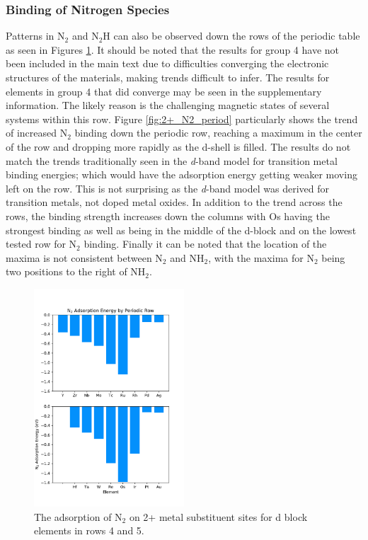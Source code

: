 \subsubsection{Binding of Nitrogen Species}

Patterns in N$_2$ and N$_2$H can also be observed down the rows of the periodic table as seen in Figures \ref{fig:N2_rows}. It should be noted that the results for group 4 have not been included in the main text due to difficulties converging the electronic structures of the materials, making trends difficult to infer. The results for elements in group 4 that did converge may be seen in the supplementary information. The likely reason is the challenging magnetic states of several systems within this row. Figure \ref{fig:2+_N2_period} particularly shows the trend of increased N$_2$ binding down the periodic row, reaching a maximum in the center of the row and dropping more rapidly as the d-shell is filled. The results do not match the trends traditionally seen in the \textit{d}-band model\cite{Nilsson_2008} for transition metal binding energies; which would have the adsorption energy getting weaker moving left on the row. This is not surprising as the \textit{d}-band model was derived for transition metals, not doped metal oxides. In addition to the trend across the rows, the binding strength increases down the columns with Os having the strongest binding as well as being in the middle of the d-block and on the lowest tested row for N$_2$ binding. Finally it can be noted that the location of the maxima is not consistent between N$_2$ and NH$_2$, with the maxima for N$_2$ being two positions to the right of NH$_2$.


\begin{figure}
    
    \centering
    \includegraphics[width=0.5\textwidth]{Images/N2_adsorption_rows.pdf}
    \caption{The adsorption of N$_2$ on 2+ metal substituent sites for d block elements in rows 4 and 5.}
    \label{fig:N2_rows}
\end{figure}


